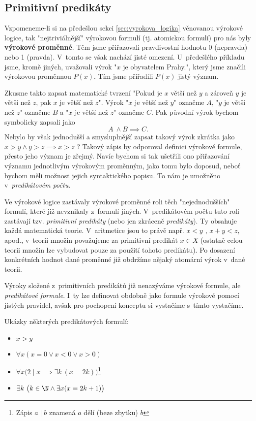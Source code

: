\subsection{Primitivní predikáty}\label{subsec:primitivni_predikaty}
Vzpomeneme-li si na předešlou sekci \ref{sec:vyrokova_logika} věnovanou výrokové logice, tak "nejtriviálnější" výrokovou formulí (tj. atomickou formulí) pro nás byly \textbf{výrokové proměnné}. Těm jsme přiřazovali pravdivostní hodnotu 0 (nepravda) nebo 1 (pravda). V~tomto se však nachází jisté omezení. U~předešlého příkladu jsme, kromě jiných, uvažovali výrok "$x$ je obyvatelem Prahy.", který jsme značili výrokovou proměnnou $P(x)$. Tím jsme přiřadili $P(x)$ jistý význam.\par
Zkusme takto zapsat matematické tvrzení "Pokud je $x$ větší než $y$ a zároveň $y$ je větší než $z$, pak $x$ je větší než $z$". Výrok "$x$ je větší než $y$" označme $A$, "$y$ je větší než $z$" označme $B$ a "$x$ je větší než $z$" označme $C$. Pak původní výrok bychom symbolicky zapsali jako
\begin{equation*}
    A~\land B \implies C.
\end{equation*}
Nebylo by však jednodušší a smysluplnější zapsat takový výrok zkrátka jako $x>y \land y>z \implies x>z$ ? Takový zápis by odporoval definici výrokové formule, přesto jeho význam je zřejmý. Navíc bychom si tak ušetřili ono přiřazování významu jednotlivým výrokovým proměnným, jako tomu bylo doposud, neboť bychom měli možnost jejich syntaktického popisu. To nám je umožněno v~\emph{predikátovém počtu}.\par
Ve výrokové logice zastávaly výrokové proměnné roli těch "nejednodušších" formulí, které již nevznikaly z~formulí jiných. V~predikátovém počtu tuto roli zastávají tzv. \emph{primitivní predikáty} (nebo jen zkráceně \emph{predikáty}). Ty obsahuje každá matematická teorie. V~aritmetice jsou to právě např. $x<y$ , $x+y<z$, apod., v~teorii množin považujeme za primitivní predikát $x\in X$ (ostatně celou teorii množin lze vybudovat pouze za použití tohoto predikátu). Po dosazení konkrétních hodnot dané proměnné již obdržíme nějaký atomární výrok v~dané teorii.\par
Výroky složené z~primitivních predikátů již nenazýváme výrokové formule, ale \emph{predikátové formule}. I~ty lze definovat obdobně jako formule výrokové pomocí jistých pravidel, avšak pro pochopení konceptu si vystačíme s~tímto vystačíme.
\begin{example}
    Ukázky některých predikátových formulí:
    \begin{itemize}
        \item $x>y$
        \item $\forall x (x = 0 \lor x < 0 \lor x > 0)$
        \item $\forall x \bigl(2 \mid x \implies \exists k~(x=2k)\bigr)$\footnote{Zápis $a \mid b$ znamená $a$ dělí (beze zbytku) $b$}
        \item $\exists k~\bigl(k \in \N \land \exists x (x=2k+1)\bigr)$
    \end{itemize}
\end{example}

